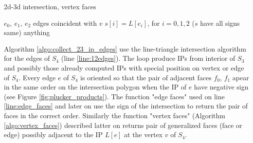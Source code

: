 \documentclass{elsarticle}
\begin{document}
\begin{algorithm}
  \caption{2d-3d intersection, vertex faces}  
  \label{algo:vertex_faces}
  
  \DontPrintSemicolon
  $e_0,\ e_1,\ e_2$ edges coincident with $v$\;
  $s[i] = L[e_i]$, for $i=0,1,2$\;
  \Else($s$ have all signs same){
    \return anything\;
  }  
\end{algorithm}

Algorithm \ref{algo:collect_23_ip_edges} use the line-triangle intersection algorithm for the edges of $S_4$ (line \ref{line:12edges}).
The loop produce IPs from interior of $S_3$ and possibly those already computed IPs with special position on vertex or edge of $S_4$. 
Every edge $e$ of $S_4$ is oriented so that the pair of adjacent faces $f_0$, $f_1$ apear in the same order on the intersection polygon when the 
IP of $e$ have negative sign (see Figure \ref{fig:plucker_products}). The function "edge faces" used on line \ref{line:edge_faces} and later on 
use the sign of the intersection to return the pair of faces in the correct order. 
Similarly the function "vertex faces" (Algorithm \ref{algo:vertex_faces}) described latter on
returns pair of generalized faces (face or edge) possibly adjacent to the IP $L[e]$ at the vertex $v$ of $S_4$.
\end{document}
